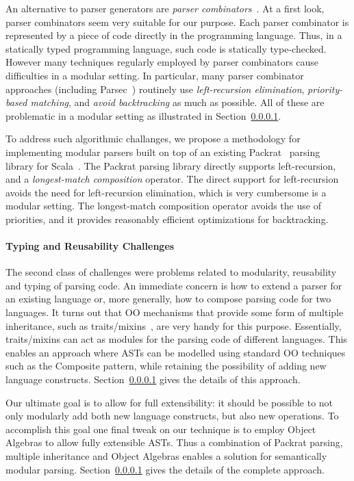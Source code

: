   An alternative to parser generators are \emph{parser
    combinators}~\cite{burge1975,Wadler1985}.  At a first look, parser
  combinators seem very suitable for our purpose. Each parser
  combinator is represented by a piece of code directly in the
  programming language. Thus, in a statically typed programming
  language, such code is statically type-checked.  However many
  techniques regularly employed by parser combinators cause difficulties in a
  modular setting. In particular, many parser combinator approaches
  (including Parsec~\cite{}) routinely use \emph{left-recursion
    elimination}, \emph{priority-based matching}, and \emph{avoid
    backtracking} as much as possible. All of these are problematic in
  a modular setting as illustrated in Section~\ref{}.

  To address such algorithmic challanges, we propose a methodology 
  for implementing modular parsers built on top of an
  existing Packrat~\cite{} parsing library for Scala~\cite{}. The Packrat parsing library
  directly supports left-recursion, and a \emph{longest-match
    composition} operator. The direct support for left-recursion
  avoids the need for left-recursion elimination, which is very
  cumbersome is a modular setting. The longest-match composition 
  operator avoids the use of priorities, and it provides reasonably
  efficient optimizations for backtracking.

  \paragraph{Typing and Reusability Challenges} The second class of
  challenges were problems related to modularity, reusability and
  typing of parsing code. An immediate concern is how to extend a
  parser for an existing language or, more generally, how to compose
  parsing code for two languages. It turns out that OO mechanisms that
  provide some form of multiple inheritance,
  such as traits/mixins~\cite{scalaoverview}, are very handy for this
  purpose. Essentially, traits/mixins can act as modules for the parsing code
  of different languages. This enables an approach where ASTs can be
  modelled using standard OO techniques such as the {\sc Composite} 
  pattern, while retaining the possibility of adding new language
  constructs. Section~\ref{} gives the details of this approach. 

  Our ultimate goal is to allow for full extensibility: it should be
  possible to not only modularly add both new language constructs, but
  also new operations. To accomplish this goal one final tweak on our
  technique is to employ Object Algebras to allow fully extensible
  ASTs. Thus a combination of Packrat parsing, multiple inheritance 
  and Object Algebras enables a solution for semantically modular 
  parsing. Section~\ref{} gives the details of the complete approach.

